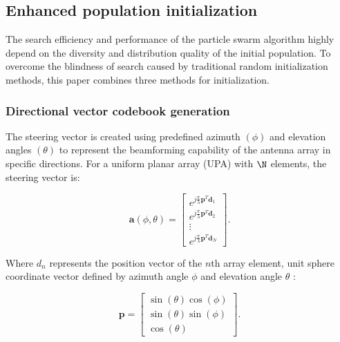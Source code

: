 \documentclass[lettersize,journal]{IEEEtran}
\begin{document}
\subsection{Enhanced population
  initialization}\label{a.-enhanced-population-initialization}

The search efficiency and performance of the particle swarm algorithm highly depend on the diversity and distribution quality of the initial population. To overcome the blindness of search caused by traditional
random initialization methods, this paper combines three methods for initialization.

\subsubsection{Directional vector codebook
  generation}\label{directional-vector-codebook-generation}

The steering vector is created using predefined azimuth \((\phi)\) and elevation angles \((\theta)\) to represent the beamforming capability of the antenna array in specific directions. For a uniform planar array (UPA) with \(\N\) elements, the steering vector is:

\begin{equation}
  \mathbf{a}(\phi,\theta) = \begin{bmatrix}
    e^{j\frac{\pi}{\lambda}\mathbf{p}^{T}\mathbf{d}_{1}} \\
    e^{j\frac{\pi}{\lambda}\mathbf{p}^{T}\mathbf{d}_{2}} \\
    \vdots                                               \\
    e^{j\frac{\pi}{\lambda}\mathbf{p}^{T}\mathbf{d}_{N}}
  \end{bmatrix}.
  \label{eq:steering_vector}
\end{equation}

Where \(d_{n}\) represents the position vector of the \(n\)th array element, unit sphere coordinate vector defined by azimuth angle \(\phi\) and elevation angle \(\theta\) :

\begin{equation}
  \mathbf{p} = \begin{bmatrix}
    \sin(\theta)\cos(\phi) \\
    \sin(\theta)\sin(\phi) \\
    \cos(\theta)
  \end{bmatrix}.
  \label{eq:unit_sphere_vector}
\end{equation}
\end{document}
